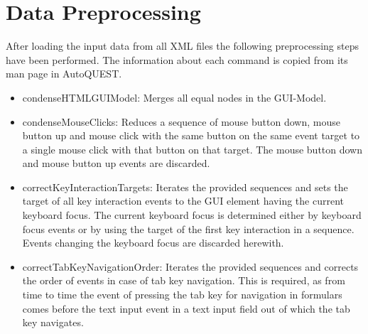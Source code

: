 \section{Data Preprocessing}
After loading the input data from all XML files the following preprocessing steps have been performed. The information about each command is copied from its man page in AutoQUEST.
\begin{itemize}
	\item condenseHTMLGUIModel: Merges all equal nodes in the GUI-Model.
	\item condenseMouseClicks: Reduces a sequence of mouse button down, mouse button up and mouse click with the same button on the same event target to a single mouse click with that button on that target. The mouse button down and mouse button up events are discarded.
	\item correctKeyInteractionTargets: Iterates the provided sequences and sets the target of all key interaction events to the GUI element having the current keyboard focus. The current keyboard focus is determined either by keyboard focus events or by using the target of the first key interaction in a sequence. Events changing the keyboard focus are discarded herewith.
	\item correctTabKeyNavigationOrder: Iterates the provided sequences and corrects the order of events in case of tab key navigation. This is required, as from time to time the event of pressing the tab key for navigation in formulars comes before the text input event in a text input field out of which the tab key navigates.
\end{itemize}


